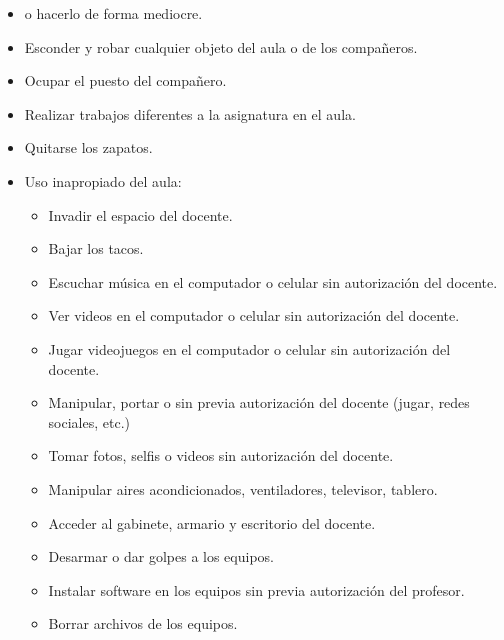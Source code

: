 \documentclass[letterpaper,10pt,spanish]{sphinxmanual}
\begin{document}
\begin{itemize}
\item {} 
\sphinxAtStartPar
{} o hacerlo de forma mediocre.

\item {} 
\sphinxAtStartPar
Esconder y robar cualquier objeto del aula o de los compañeros.

\item {} 
\sphinxAtStartPar
Ocupar el puesto del compañero.

\item {} 
\sphinxAtStartPar
Realizar trabajos diferentes a la asignatura en el aula.

\item {} 
\sphinxAtStartPar
Quitarse los zapatos.

\item {} 
\sphinxAtStartPar
Uso inapropiado del aula:
\begin{itemize}
\item {} 
\sphinxAtStartPar
Invadir el espacio del docente.

\item {} 
\sphinxAtStartPar
Bajar los tacos.

\item {} 
\sphinxAtStartPar
Escuchar música en el computador o celular sin autorización del docente.

\item {} 
\sphinxAtStartPar
Ver videos en el computador o celular sin autorización del docente.

\item {} 
\sphinxAtStartPar
Jugar videojuegos en el computador o celular sin autorización del docente.

\item {} 
\sphinxAtStartPar
Manipular, portar o  sin previa autorización del docente (jugar, redes sociales, etc.)

\item {} 
\sphinxAtStartPar
Tomar fotos, selfis o videos sin autorización del docente.

\item {} 
\sphinxAtStartPar
Manipular aires acondicionados, ventiladores, televisor, tablero.

\item {} 
\sphinxAtStartPar
Acceder al gabinete, armario y escritorio del docente.

\item {} 
\sphinxAtStartPar
Desarmar o dar golpes a los equipos.

\item {} 
\sphinxAtStartPar
Instalar software en los equipos sin previa autorización del profesor.

\item {} 
\sphinxAtStartPar
Borrar archivos de los equipos.

\end{itemize}

\end{itemize}
\end{document}
